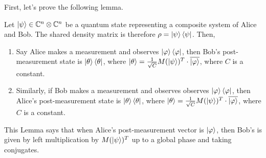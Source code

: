 First, let's prove the following lemma.




\begin{lemma}
\label{end state lemma}
Let $\ket{\psi} \in \mathbb{C}^n \otimes \mathbb{C}^{n}$ be a quantum state representing a composite system of Alice and Bob.  The shared density matrix is therefore $\rho = \ket{\psi}\bra{\psi}$. Then,
\begin{enumerate}
\item Say Alice makes a measurement and observes $\ket{\varphi}\bra{\varphi}$, then Bob's post-measurement state is $\ket{\theta}\bra{\theta}$, where $\ket{\theta}=\frac{1}{\sqrt{C}}M(\ket{\psi})^T \cdot \overline{\ket{\varphi}}$, where $C$ is a constant.
\item Similarly, if Bob makes a measurement and observes observes $\ket{\varphi}\bra{\varphi}$, then Alice's post-measurement state is $\ket{\theta}\bra{\theta}$, where $\ket{\theta}=\frac{1}{\sqrt{C}}M(\ket{\psi})^T\cdot \overline{\ket{\varphi}}$, where $C$ is a constant.\\

\end{enumerate}
\end{lemma}

This Lemma says that when Alice's post-measurement vector is $\ket{\varphi}$, then Bob's is given by left multiplication by $M(\ket{\psi})^T$ up to a global phase and taking conjugates.

